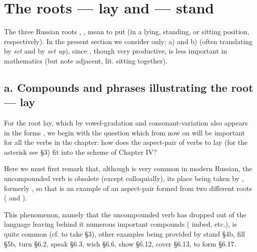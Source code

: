 \section{The roots  --- lay and  --- stand}

The three Russian roots , ,  mean to put (in a lying, standing, or sitting position, respectively). In the present section we consider only: a)  and b)  (often translating  by \emph{set} and  by \emph{set up}), since , though very productive, is less important in mathematics (but note  adjacent, lit. sitting together).

\subsection*{a. Compounds and phrases illustrating the root  --- lay}

For the root  lay, which by vowel-gradation and consonant-variation also appears in the forms , we begin with the question which from now on will be important for all the verbs in the chapter: how does the aspect-pair of verbs  to lay (for the asterisk see §3) fit into the scheme of Chapter IV?

Here we must first remark that, although  is very common in modern Russian, the uncompounded verb  is obsolete (except colloquially), its place being taken by , formerly , so that  is an example of an aspect-pair formed from two different roots ( and ).

This phenomenon, namely that the uncompounded verb  has dropped out of the language leaving behind it numerous important compounds ( imbed, etc.), is quite common (cf.  to take §3), other examples being provided by  stand §4b,  fill §5b,  turn §6.2,  speak §6.3,  wish §6.6,  show §6.12,  cover §6.13,  to form §6.17.

